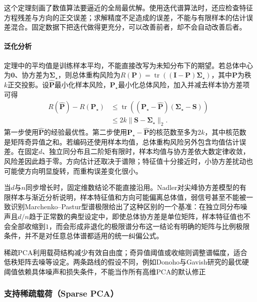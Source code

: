 这个定理刻画了数值算法要逼近的全局最优解。使用迭代谱算法时，还应检查特征方程残差与方向的正交误差；求解精度不足造成的误差，不能与有限样本的估计误差混合。固定数据下把迭代做得更充分，可以改善前者，却不会自动改善后者。

\paragraph{泛化分析}

定理中的平均值是训练样本平均，不能直接改写为未知分布下的期望。若总体中心为$\bm{0}$、协方差为$\bm{\Sigma}_{\star}$，则总体重构风险为$R(\bm{P})=\operatorname{tr}((\bm{I}-\bm{P})\bm{\Sigma}_{\star})$，其中$\bm{P}$为秩$k$正交投影。设$\widehat{\bm{P}}$最小化样本风险，$\bm{P}_{\star}$最小化总体风险，加入并减去样本协方差项可得
\begin{equation}
  \begin{aligned}
  R(\widehat{\bm{P}})-R(\bm{P}_{\star})
  &\leq\operatorname{tr}
      ((\bm{P}_{\star}-\widehat{\bm{P}})
        (\bm{\Sigma}_{\star}-\bm{S}))\\
  &\leq 2k\lVert\bm{S}-\bm{\Sigma}_{\star}\rVert_2.
  \end{aligned}
  \label{eq:dim-pca-excess-risk}
\end{equation}
第一步使用$\widehat{\bm{P}}$的经验最优性。第二步使用$\bm{P}_{\star}-\widehat{\bm{P}}$的核范数至多为$2k$，其中核范数是矩阵奇异值之和。若编码还使用样本均值，总体重构风险另外包含均值估计误差。在固定$d$、独立同分布且二阶矩有限时，样本均值与协方差依大数定律收敛，风险差因此趋于零。方向估计还取决于谱隙；特征值十分接近时，小协方差扰动也可能使方向明显旋转，而重构误差变化很小。

当$d$与$n$同步增长时，固定维数结论不能直接沿用。Nadler对尖峰协方差模型的有限样本与渐近分析说明，样本特征值和方向可能偏离总体值，弱信号甚至不能被一致识别Marchenko--Pastur型谱极限给出了这种区别的一个基准：在独立同分布噪声且$d/n$趋于正常数的典型设定中，即使总体协方差是单位矩阵，样本特征值也不会全部收缩到$1$，而会形成非退化的极限谱分布这一结论有明确的矩阵与比例极限条件，并不是对任意总体谱都适用的统一纠偏公式。

稀疏PCA利用载荷结构减少有效自由度；奇异值阈值或收缩则调整谱幅度，适合低秩矩阵去噪等设定。两条路线的假设不同，例如Donoho与Gavish研究的最优硬阈值依赖具体噪声和损失条件，不能当作所有高维PCA的默认修正

\subsubsection{支持稀疏载荷（Sparse PCA）}
\label{sec:dim-sparse-pca}

